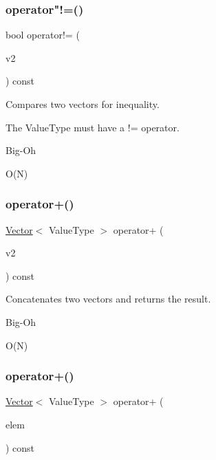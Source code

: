 \subsubsection{\texorpdfstring{operator"!=()}{operator!=()}}
{\footnotesize\ttfamily bool operator!= (\begin{DoxyParamCaption}\item[{const \mbox{\hyperlink{classVector}{Vector}}$<$ Value\+Type $>$ \&}]{v2 }\end{DoxyParamCaption}) const}



Compares two vectors for inequality. 

The Value\+Type must have a != operator. \begin{DoxyRefDesc}{Big-\/\+Oh}
\item[\mbox{\hyperlink{BigOh__BigOh000142}{Big-\/\+Oh}}]O(\+N) \end{DoxyRefDesc}
\mbox{\label{classVector_acb70fcd67f846bf16b96223bcf43e476}} 
\subsubsection{\texorpdfstring{operator+()}{operator+()}\hspace{0.1cm}{\footnotesize\ttfamily [1/2]}}
{\footnotesize\ttfamily \mbox{\hyperlink{classVector}{Vector}}$<$ Value\+Type $>$ operator+ (\begin{DoxyParamCaption}\item[{const \mbox{\hyperlink{classVector}{Vector}}$<$ Value\+Type $>$ \&}]{v2 }\end{DoxyParamCaption}) const}



Concatenates two vectors and returns the result. 

\begin{DoxyRefDesc}{Big-\/\+Oh}
\item[\mbox{\hyperlink{BigOh__BigOh000137}{Big-\/\+Oh}}]O(\+N) \end{DoxyRefDesc}
\mbox{\label{classVector_ab2024a99b90c3bc71e3007f8dc5b38fa}} 
\subsubsection{\texorpdfstring{operator+()}{operator+()}\hspace{0.1cm}{\footnotesize\ttfamily [2/2]}}
{\footnotesize\ttfamily \mbox{\hyperlink{classVector}{Vector}}$<$ Value\+Type $>$ operator+ (\begin{DoxyParamCaption}\item[{const Value\+Type \&}]{elem }\end{DoxyParamCaption}) const}



